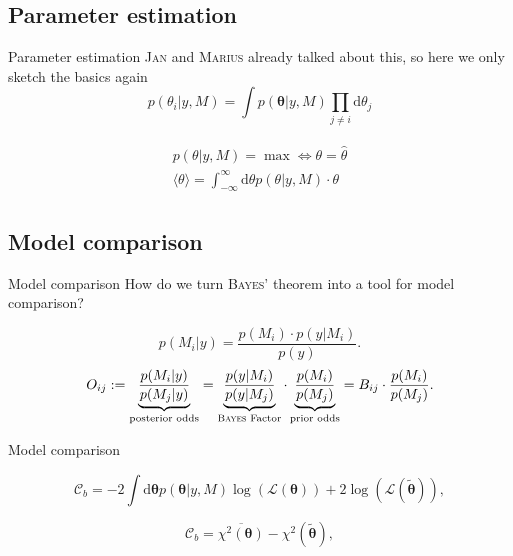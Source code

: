 \documentclass[11pt,aspectratio=1610,dvipsnames]{beamer}
\begin{document}
\subsection{Parameter estimation}
\begin{frame}{Parameter estimation}
	\textsc{Jan} and \textsc{Marius} already talked about this, so here we only sketch the basics again
	\begin{equation}
		\label{eq:marp}
		p(\theta_i|y,M)=\int p(\boldsymbol{\theta}|y,M)\prod_{j\neq i}\text{d}{\theta_j}
	\end{equation}

\begin{align}
	\begin{split}
		p(\theta|y,M)=\max \Leftrightarrow \theta=\hat{\theta}\\
		\langle\theta\rangle=\int_{-\infty}^{\infty}\text{d}\theta  p(\theta|y,M)\cdot\theta
	\end{split}
\end{align}
\end{frame}

\subsection{Model comparison}
\begin{frame}{Model comparison}
	How do we turn \textsc{Bayes'} theorem into a tool for model comparison?
	\begin{tcolorbox}[colback=black!5,colframe=gray!15!black,title=\textsc{Bayes} factor] 
		\begin{equation}
			p(M_i|y)=\frac{p(M_i)\cdot p(y|M_i)}{p(y)}.
		\end{equation}
		\begin{equation}\label{eq:bf}
			O_{ij}:=\underbrace{\frac{p(M_i|y)}{p(M_j|y)}}_{\text{posterior odds}}=\underbrace{\frac{p(y|M_i)}{p(y|M_j)}}_{\text{\textsc{Bayes} Factor}}\cdot\underbrace{\frac{p(M_i)}{p(M_j)}}_{\text{prior odds}}=B_{ij}\cdot\frac{p(M_i)}{p(M_j)}.
		\end{equation}
	\end{tcolorbox}
\end{frame}
\begin{frame}{Model comparison}

	\begin{tcolorbox}[colback=black!5,colframe=gray!15!black,title=\textsc{Bayesian} complexity] 
		\begin{equation}\label{eq:Bayes_Complexity}
			\mathcal{C}_b=-2\int \text{d}\boldsymbol{\theta} p(\boldsymbol{\theta}|y,M)\log(\mathcal{L}(\boldsymbol{\theta}))+2\log(\mathcal{L}(\boldsymbol{\tilde{\theta}})),
		\end{equation}
	
		\begin{equation}\label{eq:Bayes_Complexity_alt}
		\mathcal{C}_b=\overline{\chi^2(\boldsymbol{\theta})}-\chi^2(\boldsymbol{\tilde{\theta}}),
	\end{equation}
	\end{tcolorbox}
\end{frame}
\end{document}
